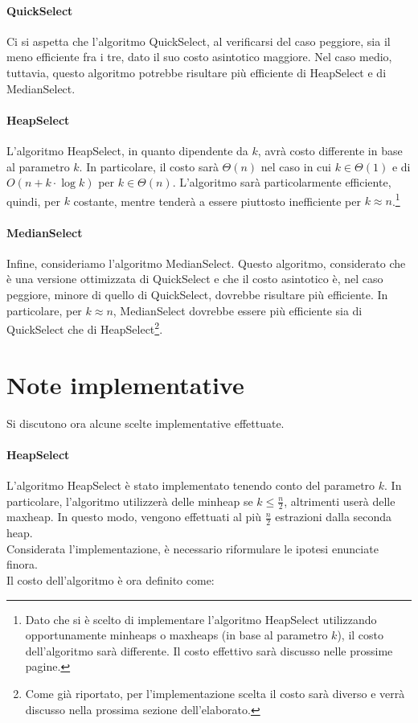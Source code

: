 \documentclass{article}
\begin{document}
	\paragraph{QuickSelect}
	Ci si aspetta che l'algoritmo QuickSelect, al verificarsi del caso peggiore, sia il meno efficiente fra i tre, dato il suo costo asintotico maggiore. Nel caso medio, tuttavia, questo algoritmo potrebbe risultare più efficiente di HeapSelect e di MedianSelect.
	
	\paragraph{HeapSelect}
	\label{section:theory}
	L'algoritmo HeapSelect, in quanto dipendente da $k$, avrà costo differente in base al parametro $k$.
	In particolare, il costo sarà $\Theta\left(n\right)$ nel caso in cui $k\in\Theta(1)$ e di $O\left(n + k\cdot\log{k}\right)$ per $k\in\Theta\left(n\right)$. L'algoritmo sarà particolarmente efficiente, quindi, per $k$ costante, mentre tenderà a essere piuttosto inefficiente per $k\approx n$.\footnote{Dato che si è scelto di implementare l'algoritmo HeapSelect utilizzando opportunamente minheaps o maxheaps (in base al parametro $k$), il costo dell'algoritmo sarà differente. Il costo effettivo sarà discusso nelle prossime pagine.} 
	
	\paragraph{MedianSelect}
	Infine, consideriamo l'algoritmo MedianSelect. Questo algoritmo, considerato che è una versione ottimizzata di QuickSelect	e che il costo asintotico è, nel caso peggiore, minore di quello di QuickSelect, dovrebbe risultare più efficiente. In particolare, per $k\approx n$, MedianSelect dovrebbe essere più efficiente sia di QuickSelect che di HeapSelect\footnote{Come già riportato, per l'implementazione scelta il costo sarà diverso e verrà discusso nella prossima sezione dell'elaborato.}.
	
	\newpage
	
	\section{Note implementative}
	\label{section:impl_notes}
	Si discutono ora alcune scelte implementative effettuate.
	
	\paragraph{HeapSelect}
	L'algoritmo HeapSelect è stato implementato tenendo conto del parametro $k$. In particolare, l'algoritmo utilizzerà delle minheap se $k\leq \frac{n}{2}$, altrimenti userà delle maxheap. In questo modo, vengono effettuati al più $\frac{n}{2}$ estrazioni dalla seconda heap. \\ Considerata l'implementazione, è necessario riformulare le ipotesi enunciate finora. \\ Il costo dell'algoritmo è ora definito come:
	
\end{document}
